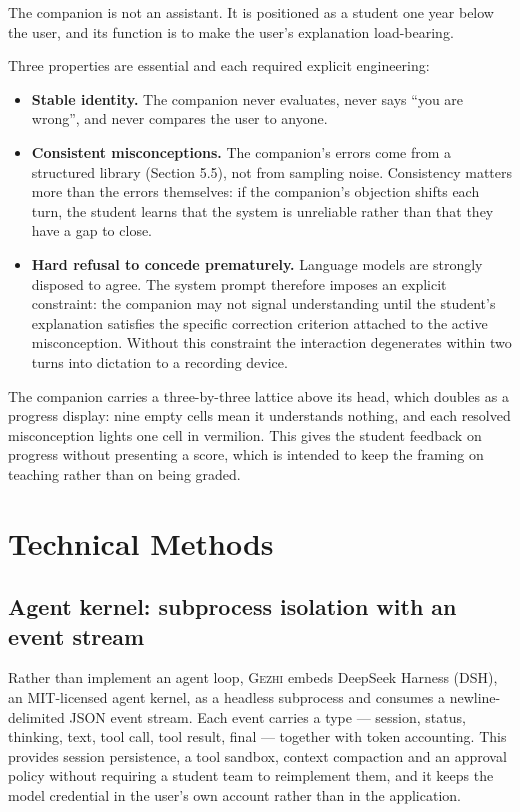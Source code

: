 \documentclass[11pt,a4paper]{article}
\newcommand{\gezhi}{\textsc{Gezhi}}
\begin{document}
The companion is not an assistant. It is positioned as a student one year below the user,
and its function is to make the user's explanation load-bearing.

Three properties are essential and each required explicit engineering:

\begin{itemize}
  \item \textbf{Stable identity.} The companion never evaluates, never says ``you are
  wrong'', and never compares the user to anyone.
  \item \textbf{Consistent misconceptions.} The companion's errors come from a structured
  library (Section 5.5), not from sampling noise. Consistency matters more than the errors
  themselves: if the companion's objection shifts each turn, the student learns that the
  system is unreliable rather than that they have a gap to close.
  \item \textbf{Hard refusal to concede prematurely.} Language models are strongly disposed
  to agree. The system prompt therefore imposes an explicit constraint: the companion may
  not signal understanding until the student's explanation satisfies the specific correction
  criterion attached to the active misconception. Without this constraint the interaction
  degenerates within two turns into dictation to a recording device.
\end{itemize}

The companion carries a three-by-three lattice above its head, which doubles as a progress
display: nine empty cells mean it understands nothing, and each resolved misconception
lights one cell in vermilion. This gives the student feedback on progress without presenting
a score, which is intended to keep the framing on teaching rather than on being graded.

\section{Technical Methods}

\subsection{Agent kernel: subprocess isolation with an event stream}

Rather than implement an agent loop, \gezhi{} embeds DeepSeek Harness (DSH), an MIT-licensed
agent kernel, as a headless subprocess and consumes a newline-delimited JSON event stream.
Each event carries a type --- session, status, thinking, text, tool call, tool result,
final --- together with token accounting. This provides session persistence, a tool sandbox,
context compaction and an approval policy without requiring a student team to reimplement
them, and it keeps the model credential in the user's own account rather than in the
application.
\end{document}
